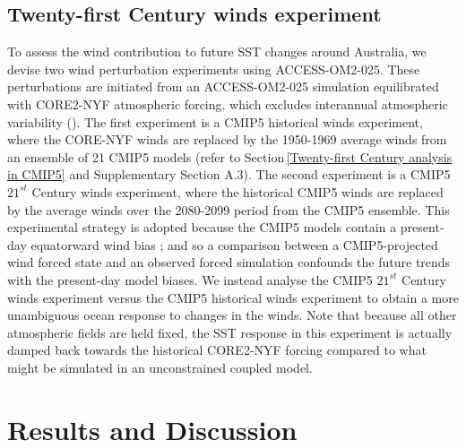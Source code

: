 \documentclass[draft,linenumbers]{agujournal2018}
\begin{document}
\subsection{Twenty-first Century winds experiment} \label{Twenty-first Century winds experiment}
To assess the wind contribution to future SST changes around Australia, we devise two wind perturbation experiments using ACCESS-OM2-025. These perturbations are initiated from an ACCESS-OM2-025 simulation equilibrated with CORE2-NYF atmospheric forcing, which excludes interannual atmospheric variability (\citealp{Large2009}). The first experiment is a CMIP5 historical winds experiment, where the CORE-NYF winds are replaced by the 1950-1969 average winds from an ensemble of 21 CMIP5 models (refer to Section\,\ref{Twenty-first Century analysis in CMIP5} and Supplementary Section A.3). The second experiment is a CMIP5 $21^{st}$ Century winds experiment, where the historical CMIP5 winds are replaced by the average winds over the 2080-2099 period from the CMIP5 ensemble. This experimental strategy is adopted because the CMIP5 models contain a present-day equatorward wind bias \citep{Bracegirdle2013}; and so a comparison between a CMIP5-projected wind forced state and an observed forced simulation confounds the future trends with the present-day model biases. We instead analyse the CMIP5 $21^{st}$ Century winds experiment versus the CMIP5 historical winds experiment to obtain a more unambiguous ocean response to changes in the winds. Note that because all other atmospheric fields are held fixed, the SST response in this experiment is actually damped back towards the historical CORE2-NYF forcing compared to what might be simulated in an unconstrained coupled model.

\section{Results and Discussion}
\end{document}
